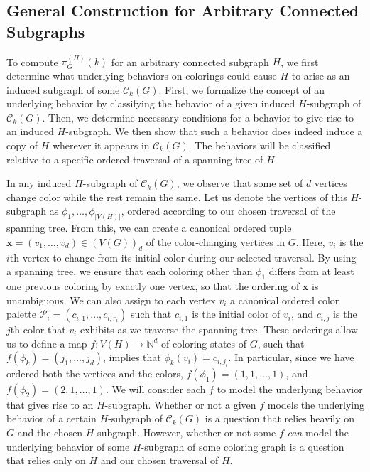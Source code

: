 \documentclass[12pt,reqno,dvipsnames]{amsart}
\theoremstyle{definition}
\begin{document}
\subsection{General Construction for Arbitrary Connected Subgraphs}

To compute $\pi_G^{(H)}(k)$ for an arbitrary connected subgraph $H$, we first determine what underlying behaviors on colorings could cause $H$ to arise as an induced subgraph of some $\mathcal{C}_k(G)$. First, we formalize the concept of an underlying behavior by classifying the behavior of a given induced $H$-subgraph of $\mathcal{C}_k(G)$. Then, we determine necessary conditions for a behavior to give rise to an induced $H$-subgraph. We then show that such a behavior does indeed induce a copy of $H$ wherever it appears in $\mathcal{C}_k(G)$. The behaviors will be classified relative to a specific ordered traversal of a spanning tree of $H$

In any induced $H$-subgraph of $\mathcal{C}_k(G)$, we observe that some set of $d$ vertices change color while the rest remain the same. Let us denote the vertices of this $H$-subgraph as $\phi_1, \dots, \phi_{|V(H)|}$, ordered according to our chosen traversal of the spanning tree. From this, we can create a canonical ordered tuple $\mathbf{x}=(v_1,\dots,v_d)\in (V(G))_d$ of the color-changing vertices in $G$. Here, $v_i$ is the $i$th vertex to change from its initial color during our selected traversal. By using a spanning tree, we ensure that each coloring other than $\phi_1$ differs from at least one previous coloring by exactly one vertex, so that the ordering of $\mathbf{x}$ is unambiguous. We can also assign to each vertex $v_i$ a canonical ordered color palette $\mathcal{P}_i=(c_{i,1},\dots,c_{i,r_i})$ such that $c_{i,1}$ is the initial color of $v_i$, and $c_{i,j}$ is the $j$th color that $v_i$ exhibits as we traverse the spanning tree. These orderings allow us to define a map $f\colon V(H) \to \mathbb{N}^d$ of coloring states of $G$, such that $f(\phi_k)=(j_1,\dots,j_d)$, implies that $\phi_k(v_i)=c_{i,j_i}$. In particular, since we have ordered both the vertices and the colors, $f(\phi_1)=(1,1,\dots, 1)$, and $f(\phi_2)=(2,1,\dots, 1)$. We will consider each $f$ to model the underlying behavior that gives rise to an $H$-subgraph. Whether or not a given $f$ models the underlying behavior of a certain $H$-subgraph of $\mathcal{C}_k(G)$ is a question that relies heavily on $G$ and the chosen $H$-subgraph. However, whether or not some $f$ \emph{can} model the underlying behavior of some $H$-subgraph of some coloring graph is a question that relies only on $H$ and our chosen traversal of $H$.
\end{document}

